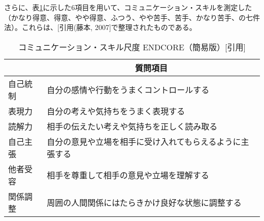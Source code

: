 \documentclass[11pt, a4paper]{jreport} %
\begin{document}
さらに、表\ref{tab:daibo3}に示した6項目を用いて、コミュニケーション・スキルを測定した（かなり得意、得意、やや得意、ふつう、やや苦手、苦手、かなり苦手、の七件法）。これらは、[引用(藤本, 2007]で整理されたものである。
\begin{table}[H]
\caption{コミュニケーション・スキル尺度 ENDCORE（簡易版）[引用]}
\label{tab:daibo3}
\centering
\begin{tabular}{@{}ll@{}}
\toprule
\multicolumn{1}{c}{} & \multicolumn{1}{c}{質問項目}     \\ \midrule
自己統制                 & 自分の感情や行動をうまくコントロールする         \\
表現力                  & 自分の考えや気持ちをうまく表現する            \\
読解力                  & 相手の伝えたい考えや気持ちを正しく読み取る        \\
自己主張                 & 自分の意見や立場を相手に受け入れてもらえるように主張する \\
他者受容                 & 相手を尊重して相手の意見や立場を理解する         \\
関係調整                 & 周囲の人間関係にはたらきかけ良好な状態に調整する     \\ \bottomrule
\end{tabular}
\end{table}

\begin{comment}
\begin{description}
\setlength{\parskip}{-0.1cm} %
  \setlength{\itemsep}{-0.1cm} %

\item{自己統制} 自分の感情や行動をうまくコントロールする
\item{表現力} 自分の考えや気持ちをうまく表現する
\item{解読力} 相手の伝えたい考えや気持ちを正しく読み取る
\item{自己主張} 自分の意見や立場を相手に受け入れてもらえるように主張する
\item{他者受容} 相手を尊重して相手の意見や立場を理解する
\item{関係調整} 周囲の人間関係にはたらきかけ良好な状態に調整する
\end{description}
\end{comment}
\end{document}
